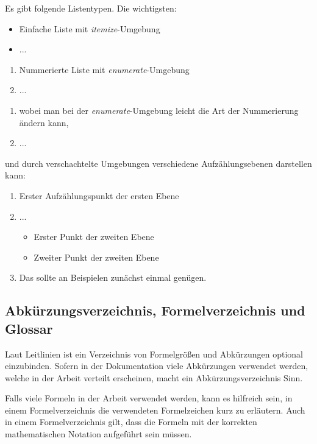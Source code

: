 Es gibt folgende Listentypen. Die wichtigsten:

\begin{itemize}
	\item Einfache Liste mit \textit{itemize}-Umgebung
	\item ...
\end{itemize}

\begin{enumerate}
	\item Nummerierte Liste mit \textit{enumerate}-Umgebung
	\item ...
\end{enumerate}

\begin{enumerate}[label=\alph*.]
	\item wobei man bei der \textit{enumerate}-Umgebung leicht die Art der Nummerierung ändern kann,
	\item ...
\end{enumerate}

und durch verschachtelte Umgebungen verschiedene Aufzählungsebenen darstellen kann:

\begin{enumerate}[label=\alph*)]
	\item Erster Aufzählungspunkt der ersten Ebene
	\item ...
	\begin{itemize}
		\item Erster Punkt der zweiten Ebene
		\item Zweiter Punkt der zweiten Ebene
	\end{itemize}
	\item Das sollte an Beispielen zunächst einmal genügen.
\end{enumerate}

\clearpage

\subsection{Abkürzungsverzeichnis, Formelverzeichnis und Glossar}

Laut Leitlinien ist ein Verzeichnis von Formelgrößen und Abkürzungen optional einzubinden. Sofern in der Dokumentation viele Abkürzungen verwendet werden, welche in der Arbeit verteilt erscheinen, macht ein Abkürzungsverzeichnis Sinn.

Falls viele Formeln in der Arbeit verwendet werden, kann es hilfreich sein, in einem Formelverzeichnis die verwendeten Formelzeichen kurz zu erläutern. Auch in einem Formelverzeichnis gilt, dass die Formeln mit der korrekten mathematischen Notation aufgeführt sein müssen.

